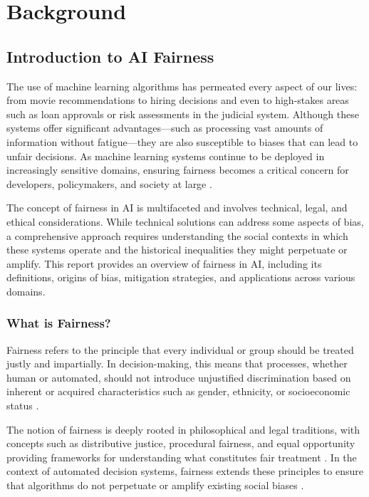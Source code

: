 \documentclass[12pt,a4paper,openright,twoside]{book}
\begin{document}
\chapter{Background}
\section{Introduction to AI Fairness}
The use of machine learning algorithms has permeated every aspect of our lives: from movie recommendations to hiring decisions and even to high-stakes areas such as loan approvals or risk assessments in the judicial system. Although these systems offer significant advantages—such as processing vast amounts of information without fatigue—they are also susceptible to biases that can lead to unfair decisions. As machine learning systems continue to be deployed in increasingly sensitive domains, ensuring fairness becomes a critical concern for developers, policymakers, and society at large \cite{mehrabi2021survey}.

The concept of fairness in AI is multifaceted and involves technical, legal, and ethical considerations. While technical solutions can address some aspects of bias, a comprehensive approach requires understanding the social contexts in which these systems operate and the historical inequalities they might perpetuate or amplify. This report provides an overview of fairness in AI, including its definitions, origins of bias, mitigation strategies, and applications across various domains.

\subsection{What is Fairness?}
Fairness refers to the principle that every individual or group should be treated justly and impartially. In decision-making, this means that processes, whether human or automated, should not introduce unjustified discrimination based on inherent or acquired characteristics such as gender, ethnicity, or socioeconomic status \cite{smuha2021}.

The notion of fairness is deeply rooted in philosophical and legal traditions, with concepts such as distributive justice, procedural fairness, and equal opportunity providing frameworks for understanding what constitutes fair treatment \cite{kuppler2021distributivejusticefairnessmetrics}. In the context of automated decision systems, fairness extends these principles to ensure that algorithms do not perpetuate or amplify existing social biases \cite{algorithmBono2021}.
\end{document}
